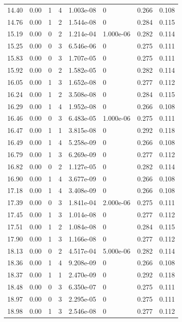 \documentclass[preview]{standalone}
\begin{document}
{{{\begin{tabular}{L{1.2cm}C{1.2cm} C{0.3cm}C{0.5cm} C{1.4cm}C{1.4cm} C{1.4cm}C{1.4cm}}
  14.40  &  0.00  & 1     &  4 &  1.003e-08  & 0  & 0.266 &  0.108   \\ 
  14.76  &  0.00  & 1     &  2 &  1.544e-08  & 0  & 0.284 &  0.115   \\ 
  15.19  &  0.00  & 0     &  2 &  1.214e-04  & 1.000e-06  & 0.282 &  0.114   \\ 
  15.25  &  0.00  & 0     &  3 &  6.546e-06  & 0  & 0.275 &  0.111   \\ 
  15.83  &  0.00  & 0     &  3 &  1.707e-05  & 0  & 0.275 &  0.111   \\ 
  15.92  &  0.00  & 0     &  2 &  1.582e-05  & 0  & 0.282 &  0.114   \\ 
  16.05  &  0.00  & 1     &  3 &  1.652e-08  & 0  & 0.277 &  0.112   \\ 
  16.24  &  0.00  & 1     &  2 &  3.508e-08  & 0  & 0.284 &  0.115   \\ 
  16.29  &  0.00  & 1     &  4 &  1.952e-08  & 0  & 0.266 &  0.108   \\ 
  16.46  &  0.00  & 0     &  3 &  6.483e-05  & 1.000e-06  & 0.275 &  0.111   \\ 
  16.47  &  0.00  & 1     &  1 &  3.815e-08  & 0  & 0.292 &  0.118   \\ 
  16.49  &  0.00  & 1     &  4 &  5.258e-09  & 0  & 0.266 &  0.108   \\ 
  16.79  &  0.00  & 1     &  3 &  6.269e-09  & 0  & 0.277 &  0.112   \\ 
  16.82  &  0.00  & 0     &  2 &  1.127e-05  & 0  & 0.282 &  0.114   \\ 
  16.90  &  0.00  & 1     &  4 &  3.677e-09  & 0  & 0.266 &  0.108   \\ 
  17.18  &  0.00  & 1     &  4 &  3.408e-09  & 0  & 0.266 &  0.108   \\ 
  17.39  &  0.00  & 0     &  3 &  1.841e-04  & 2.000e-06  & 0.275 &  0.111   \\ 
  17.45  &  0.00  & 1     &  3 &  1.014e-08  & 0  & 0.277 &  0.112   \\ 
  17.51  &  0.00  & 1     &  2 &  1.084e-08  & 0  & 0.284 &  0.115   \\ 
  17.90  &  0.00  & 1     &  3 &  1.166e-08  & 0  & 0.277 &  0.112   \\ 
  18.13  &  0.00  & 0     &  2 &  4.517e-04  & 5.000e-06  & 0.282 &  0.114   \\ 
  18.36  &  0.00  & 1     &  4 &  9.208e-09  & 0  & 0.266 &  0.108   \\ 
  18.37  &  0.00  & 1     &  1 &  2.470e-09  & 0  & 0.292 &  0.118   \\ 
  18.48  &  0.00  & 0     &  3 &  6.350e-07  & 0  & 0.275 &  0.111   \\ 
  18.97  &  0.00  & 0     &  3 &  2.295e-05  & 0  & 0.275 &  0.111   \\ 
  18.98  &  0.00  & 1     &  3 &  2.546e-08  & 0  & 0.277 &  0.112   \\ 
\hline 
\end{tabular} 

}}}
\end{document}

